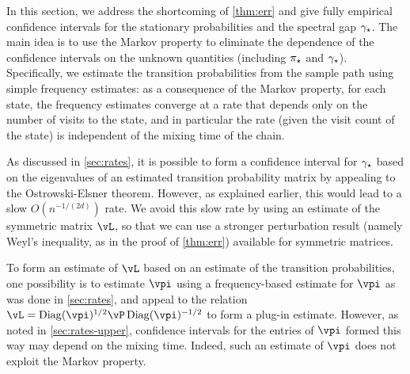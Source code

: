 In this section, we address the shortcoming of \cref{thm:err} and give
fully empirical confidence intervals for the stationary probabilities
and the spectral gap $\gamma_{\star}$.
The main idea is to use the Markov property to eliminate the
dependence of the confidence intervals on the unknown quantities
(including $\pi_{\star}$ and $\gamma_{\star}$).
Specifically, we estimate the transition probabilities from the sample
path using simple frequency estimates: as a consequence of the Markov
property, for each state, the frequency estimates converge at a rate
that depends only on the number of visits to the state, and in
particular the rate (given the visit count of the state) is
independent of the mixing time of the chain.

As discussed in \cref{sec:rates}, it is possible to form a confidence
interval for $\gamma_{\star}$ based on the eigenvalues of an estimated
transition probability matrix by appealing to the
Ostrowski-Elsner theorem.
However, as explained earlier, this would lead to a slow
$O(n^{-1/(2d)})$ rate.
We avoid this slow rate by using an estimate of the symmetric matrix
$\vL$, so that we can use a stronger perturbation result (namely Weyl's
inequality, as in the proof of \cref{thm:err}) available for symmetric matrices.

To form an estimate of $\vL$ based on an estimate of the transition
probabilities, one possibility is to estimate $\vpi$ using a
frequency-based estimate for $\vpi$ as was done in \cref{sec:rates},
and appeal to the relation $\vL = \Diag(\vpi)^{1/2} \vP
\Diag(\vpi)^{-1/2}$ to form a plug-in estimate.
However, as noted in \cref{sec:rates-upper}, confidence intervals for
the entries of $\vpi$ formed this way may depend on the mixing time.
Indeed, such an estimate of $\vpi$ does not exploit the Markov
property.

